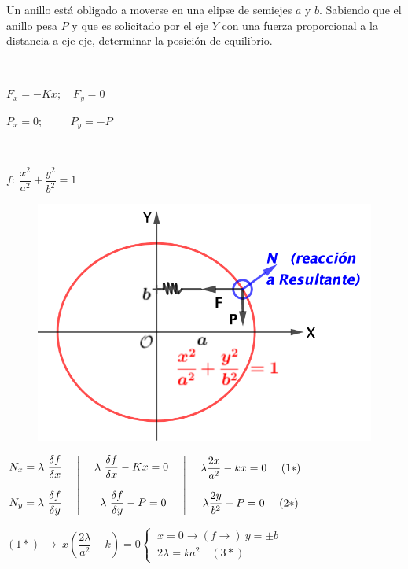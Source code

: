 \rightline{\textsf{\textcolor{DarkBlue}{--- Inacabado ---}}}




\begin{prob}
Un anillo está obligado a moverse en una elipse de 	semiejes $a$ y $b$. Sabiendo que el anillo pesa $P$ y que es solicitado por el eje $Y$ con una fuerza proporcional a la distancia a eje eje, determinar la posición de equilibrio.
\end{prob}
\begin{multicols}{2}
$\quad$

$ F_x=-Kx;\quad F_y=0 $

$P_x=0;\quad \quad \ \ P_y=-P$

$\quad$

$f : \ \dfrac{x^2}{a^2}+\dfrac{y^2}{b^2}=1$
\begin{figure}[H]
	\centering
	\includegraphics[width=.5\textwidth]{imagenes/imagenes06/T06IM11.png}
\end{figure}
\end{multicols}

$\left. \begin{matrix}  
 	\displaystyle N_x=\lambda \ \fdv{f}{x} \ \quad \\ \\ \displaystyle N_y=\lambda\  \fdv{f}{y} \ \quad 
 \end{matrix} \right|
 \left. \begin{matrix}  
 	\quad \lambda \ \displaystyle \fdv{f}{x}-Kx=0 \ \quad \\ \\ \quad \displaystyle \lambda \ \fdv{f}{y}-P=0 \quad 
 \end{matrix} \right|
\left. \begin{matrix}  
 	\quad \lambda \dfrac{2x}{a^2}-kx=0\ \quad (1*)\\ \\ \quad \lambda \dfrac{2y}{b^2}-P=0\  \quad (2*)
 \end{matrix} \right.$

$(1*)\ \to \ x\left(\dfrac{2\lambda}{a^2}-k \right)=0 \begin{cases}\ x=0 \to (f\to) \ y=\pm b \\ \ 2\lambda
=ka^2 \quad (3*) \end{cases}$

